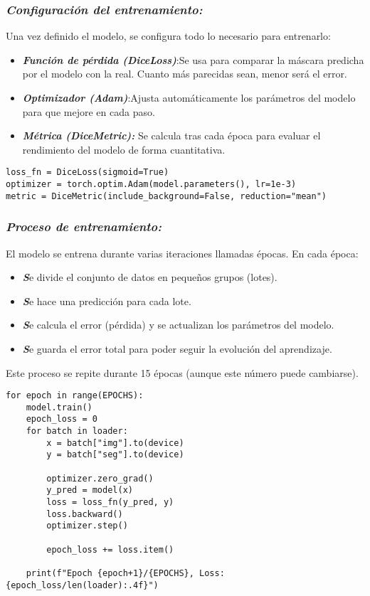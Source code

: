 \documentclass[12pt]{article}
\begin{document}
\subsubsection{\textit{Configuración del entrenamiento:}}
Una vez definido el modelo, se configura todo lo necesario para entrenarlo:
\begin{itemize}
    \item \textit\textbf \textbf{Función de pérdida (DiceLoss)}:Se usa para comparar la máscara predicha por el modelo con la real.
Cuanto más parecidas sean, menor será el error.
    \item \textit \textbf\textbf{ Optimizador (Adam)}:Ajusta automáticamente los parámetros del modelo para que mejore en cada paso.
    \item \textit \textbf \textbf{Métrica (DiceMetric):} Se calcula tras cada época para evaluar el rendimiento del modelo de forma cuantitativa.
\end{itemize}
\begin{lstlisting}[caption={Configuración de la pérdida, optimizador y métrica}, label=lst:trainconfig]
loss_fn = DiceLoss(sigmoid=True)
optimizer = torch.optim.Adam(model.parameters(), lr=1e-3)
metric = DiceMetric(include_background=False, reduction="mean")
\end{lstlisting}

\subsubsection{\textit{Proceso de entrenamiento:}}
El modelo se entrena durante varias iteraciones llamadas épocas.
En cada época:
\begin{itemize}
    \item \textit\textbf Se divide el conjunto de datos en pequeños grupos (lotes).
    \item \textit \textbf Se hace una predicción para cada lote.
    \item \textit \textbf Se calcula el error (pérdida) y se actualizan los parámetros del modelo.
    \item \textit\textbf Se guarda el error total para poder seguir la evolución del aprendizaje.
\end{itemize}
Este proceso se repite durante 15 épocas (aunque este número puede cambiarse).
\begin{lstlisting}[caption={Bucle principal de entrenamiento}, label=lst:trainloop]
for epoch in range(EPOCHS):
    model.train()
    epoch_loss = 0
    for batch in loader:
        x = batch["img"].to(device)
        y = batch["seg"].to(device)

        optimizer.zero_grad()
        y_pred = model(x)
        loss = loss_fn(y_pred, y)
        loss.backward()
        optimizer.step()

        epoch_loss += loss.item()

    print(f"Epoch {epoch+1}/{EPOCHS}, Loss: {epoch_loss/len(loader):.4f}")
\end{lstlisting}
\end{document}
